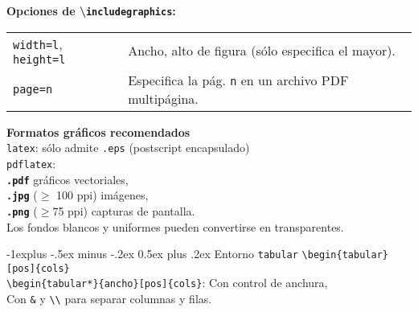 \documentclass[10pt,landscape,a4paper]{article}
\makeatletter
\renewcommand{\subsection}{\@startsection{subsection}{2}{0mm}%
                                {-1explus -.5ex minus -.2ex}%
                                {0.5ex plus .2ex}%
                                {\normalfont\normalsize\bfseries}}
\makeatother
\begin{document}
\begin{multicols}{3}
\textbf{Opciones de \textbackslash \texttt{includegraphics}:}\\

\begin{tabular}{@{}p{\the\MyLen}%
                @{}p{\linewidth-\the\MyLen}@{}}
\texttt{width=l}, \texttt{height=l}      &  Ancho, alto de figura (sólo especifica el mayor).\\
\texttt{page=n}       &  Especifica la pág. \texttt{n} en un archivo PDF multipágina.\\[0.7mm]
\end{tabular}


\textbf{Formatos gráficos recomendados}\\
\texttt{latex}: sólo admite \texttt{.eps} (postscript encapsulado)\\
\texttt{pdflatex}:\\
\quad \texttt{\textbf{.pdf}}  gráficos vectoriales,\\
\quad \texttt{\textbf{.jpg}} ($\geq$ 100 ppi)  imágenes,\\
\quad \texttt{\textbf{.png}} ($\geq$75 ppi)  capturas de pantalla.\\
\faLightbulb[regular]{} Los fondos blancos y uniformes pueden convertirse en transparentes.




\subsection{Entorno \texttt{tabular} }
\verb!\begin{tabular}[pos]{cols}! \\
\verb!\begin{tabular*}{ancho}[pos]{cols}!: Con control de anchura,\\
\hspace{15pt}Con \texttt{\&} y \verb!\\! para separar columnas y filas.\\[0.7mm]


\end{multicols}
\end{document}

